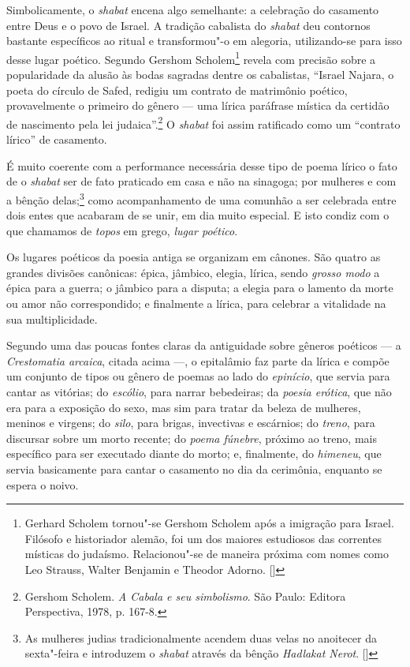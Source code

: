 Simbolicamente, o \emph{shabat} encena algo semelhante: a celebração do
casamento entre Deus e o povo de Israel. A tradição cabalista do \emph{shabat}
deu contornos bastante específicos ao ritual e transformou"-o em
alegoria, utilizando-se para isso desse lugar poético. Segundo Gershom
Scholem\footnote{Gerhard Scholem tornou"-se Gershom Scholem após a imigração para Israel. Filósofo e historiador alemão, foi um dos maiores estudiosos das correntes místicas do judaísmo. Relacionou"-se de maneira próxima com nomes como Leo Strauss, Walter Benjamin e Theodor Adorno. []} revela com precisão sobre a popularidade da alusão às bodas
sagradas dentre os cabalistas, ``Israel Najara, o poeta do círculo de
Safed, redigiu um contrato de matrimônio poético, provavelmente o
primeiro do gênero --- uma lírica paráfrase mística da certidão de
nascimento pela lei judaica''.\footnote{Gershom Scholem. \emph{A Cabala e seu simbolismo}. São Paulo: Editora Perspectiva, 1978, p. 167-8.} O \emph{shabat} foi assim
ratificado como um ``contrato lírico'' de casamento.

É muito coerente com a performance necessária desse tipo de poema lírico
o fato de o \emph{shabat} ser de fato praticado em casa e não na sinagoga; por
mulheres e com a bênção delas;\footnote{As mulheres judias tradicionalmente acendem duas velas no anoitecer da sexta"-feira e introduzem o \emph{shabat} através da bênção \emph{Hadlakat Nerot}. []} como acompanhamento de uma comunhão a ser celebrada entre dois entes que acabaram de se unir, em dia muito
especial. E isto condiz com o que chamamos de \emph{topos} em grego,
\emph{lugar poético}.


Os lugares poéticos da poesia antiga se organizam em cânones. São quatro
as grandes divisões canônicas: épica, jâmbico, elegia, lírica, sendo
\emph{grosso modo} a épica para a guerra; o jâmbico para a disputa; a
elegia para o lamento da morte ou amor não correspondido; e finalmente a
lírica, para celebrar a vitalidade na sua multiplicidade.

Segundo uma das poucas fontes claras da antiguidade sobre gêneros
poéticos --- a \emph{Crestomatia arcaica}, citada acima ---, o
epitalâmio faz parte da lírica e compõe um conjunto de tipos ou gênero
de poemas ao lado do \emph{epinício}, que servia para cantar as
vitórias; do \emph{escólio}, para narrar bebedeiras; da \emph{poesia
erótica}, que não era para a exposição do sexo, mas sim para tratar da
beleza de mulheres, meninos e virgens; do \emph{silo}, para brigas,
invectivas e escárnios; do \emph{treno}, para discursar sobre um morto
recente; do \emph{poema fúnebre}, próximo ao treno, mais específico para
ser executado diante do morto; e, finalmente, do \emph{himeneu}, que
servia basicamente para cantar o casamento no dia da cerimônia,
enquanto se espera o noivo.

